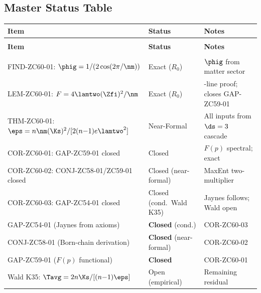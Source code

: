 \documentclass[12pt, a4paper]{article}
\begin{document}
\subsection{Master Status Table}
\label{sec:status}

{\small
\setlength{\LTpre}{4pt}\setlength{\LTpost}{4pt}
\renewcommand{\arraystretch}{1.30}
\begin{longtable}{>{\raggedright\arraybackslash}p{6.8cm}
                  >{\centering\arraybackslash}p{2.4cm}
                  >{\raggedright\arraybackslash}p{3.5cm}}
\toprule
\textbf{Item} & \textbf{Status} & \textbf{Notes} \\
\midrule
\endfirsthead
\multicolumn{3}{l}{\small\textit{(continued)}}\\[4pt]
\toprule
\textbf{Item} & \textbf{Status} & \textbf{Notes} \\
\midrule
\endhead
\midrule
\multicolumn{3}{r}{\small\textit{(continues)}}\\
\endfoot
\bottomrule
\endlastfoot
FIND-ZC60-01: $\phig=1/(2\cos(2\pi/\nm))$
  & Exact ($R_0$) & $\phig$ from matter sector \\
LEM-ZC60-01: $F=4\lamtwo(\Zfi)^2/\nm$
  & Exact ($R_0$) & 2-line proof; closes GAP-ZC59-01 \\
THM-ZC60-01: $\eps=n\nm(\Ks)^2/[2(n{-}1)e\lamtwo^2]$
  & Near-Formal & All inputs from $\ds=3$ cascade \\
COR-ZC60-01: GAP-ZC59-01 closed
  & Closed & $F(p)$ spectral; exact \\
COR-ZC60-02: CONJ-ZC58-01/ZC59-01 closed
  & Closed (near-formal) & MaxEnt two-multiplier \\
COR-ZC60-03: GAP-ZC54-01 closed
  & Closed (cond.\ Wald K35) & Jaynes follows; Wald open \\
\midrule
GAP-ZC54-01 (Jaynes from axioms)
  & \textbf{Closed} (cond.) & COR-ZC60-03 \\
CONJ-ZC58-01 (Born-chain derivation)
  & \textbf{Closed} (near-formal) & COR-ZC60-02 \\
GAP-ZC59-01 ($F(p)$ functional)
  & \textbf{Closed} & COR-ZC60-01 \\
\midrule
Wald K35: $\Tavg=2n\Ks/[(n{-}1)\eps]$
  & Open (empirical) & Remaining residual \\
\bottomrule
\end{longtable}
}

\end{document}
